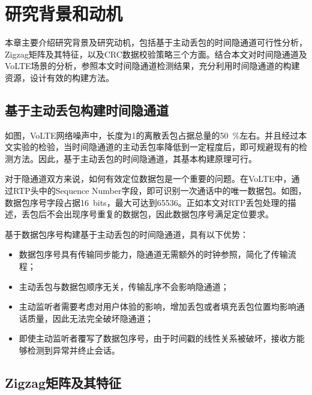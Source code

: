 \section{研究背景和动机}
\label{chap:zigzag:motivation}

本章主要介绍研究背景及研究动机，包括基于主动丢包的时间隐通道可行性分析，Zigzag矩阵及其特征，以及CRC数据校验策略三个方面。结合本文对时间隐通道及VoLTE场景的分析，参照本文时间隐通道检测结果，充分利用时间隐通道的构建资源，设计有效的构建方法。

\subsection{基于主动丢包构建时间隐通道}
\label{chap:zigzag:motivation:dropout}
如图，VoLTE网络噪声中，长度为1的离散丢包占据总量的{50\ \%}左右。并且经过本文实验的检验，当时间隐通道的主动丢包率降低到一定程度后，即可规避现有的检测方法。因此，基于主动丢包的时间隐通道，其基本构建原理可行。

对于隐通道双方来说，如何有效定位数据包是一个重要的问题。在VoLTE中，通过RTP头中的Sequence Number字段，即可识别一次通话中的唯一数据包。如图，数据包序号字段占据{16\ bits}，最大可达到65536。正如本文对RTP丢包处理的描述，丢包后不会出现序号重复的数据包，因此数据包序号满足定位要求。

基于数据包序号构建基于主动丢包的时间隐通道，具有以下优势：
\begin{itemize}
    \item 数据包序号具有传输同步能力，隐通道无需额外的时钟参照，简化了传输流程；
    \item 主动丢包与数据包顺序无关，传输乱序不会影响隐通道；
    \item 主动监听者需要考虑对用户体验的影响，增加丢包或者填充丢包位置均影响通话质量，因此无法完全破坏隐通道；
    \item 即使主动监听者覆写了数据包序号，由于时间戳的线性关系被破坏，接收方能够检测到异常并终止会话。
\end{itemize}

\subsection{Zigzag矩阵及其特征}
\label{chap:zigzag:motivation:zigzag}

